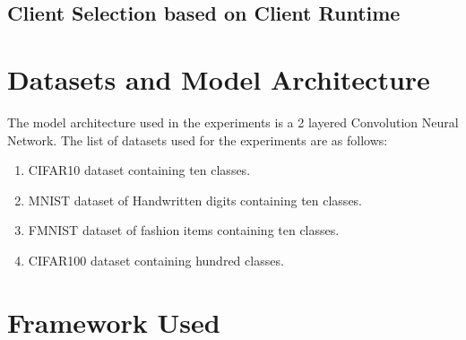 \documentclass[conference]{IEEEtran}
\begin{document}
\subsection{Client Selection based on Client Runtime}

\section{Datasets and Model Architecture}
The model architecture used in the experiments is a 2 layered Convolution Neural Network. The list of datasets used for the experiments are as follows:
\begin{enumerate}
    \item CIFAR10 \cite{cifar10} dataset containing ten classes.
    \item MNIST \cite{lecun1998mnist} dataset of Handwritten digits containing ten classes. 
    \item FMNIST \cite{xiao2017fashionmnistnovelimagedataset} dataset of fashion items containing ten classes.
    \item CIFAR100 \cite{Krizhevsky09learningmultiple} dataset containing hundred classes. 
\end{enumerate}

\section{Framework Used}
\end{document}
